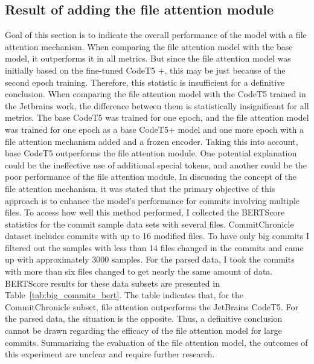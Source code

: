 \subsection{Result of adding the file attention module}
Goal of this section is to indicate the overall performance of the model with a file attention mechanism. When comparing the file attention model with the base model, it outperforms it in all metrics. But since the file attention model was initially based on the fine-tuned CodeT5 +, this may be just because of the second epoch training. Therefore, this statistic is insufficient for a definitive conclusion. 
When comparing the file attention model with the CodeT5 trained in the Jetbrains work, the difference between them is statistically insignificant for all metrics. The base CodeT5 was trained for one epoch, and the file attention model was trained for one epoch as a base CodeT5+ model and one more epoch with a file attention mechanism added and a frozen encoder. Taking this into account, base CodeT5 outperforms the file attention module. One potential explanation could be the ineffective use of additional special tokens, and another could be the poor performance of the file attention module.
In discussing the concept of the file attention mechanism, it was stated that the primary objective of this approach is to enhance the model's performance for commits involving multiple files. To access how well this method performed, I collected the BERTScore statistics for the commit sample data sets with several files. CommitChronicle dataset includes commits with up to 16 modified files. To have only big commits I filtered out the samples with less than 14 files changed in the commits and came up with approximately 3000 samples. For the parsed data, I took the commits with more than six files changed to get nearly the same amount of data. BERTScore results for these data subsets are presented in Table~\ref{tab:big_commits_bert}.
The table indicates that, for the CommitChronicle subset, file attention outperforms the JetBrains CodeT5. For the parsed data, the situation is the opposite. Thus, a definitive conclusion cannot be drawn regarding the efficacy of the file attention model for large commits.
Summarizing the evaluation of the file attention model, the outcomes of this experiment are unclear and require further research.
